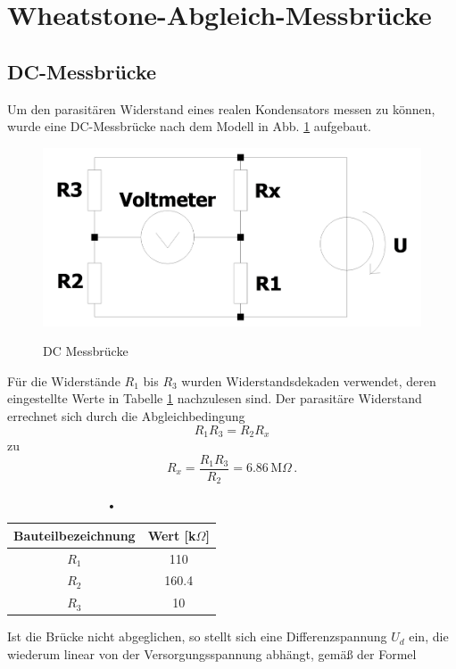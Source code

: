 \section{Wheatstone-Abgleich-Messbrücke}
\subsection{DC-Messbrücke}
Um den parasitären Widerstand eines realen Kondensators messen zu können, wurde eine DC-Messbrücke nach dem Modell in Abb. \ref{fig:dc_messbruecke} aufgebaut. 
\begin{figure}[H]
	\includegraphics[width=\textwidth]{./img/ch3/DC_Wheatstone_Messbruecke.png}
	\label{fig:dc_messbruecke}
	\caption{DC Messbrücke}
\end{figure}
Für die Widerstände $R_1$ bis $R_3$ wurden Widerstandsdekaden verwendet, deren eingestellte Werte in Tabelle \ref{tb:dc_bt} nachzulesen sind. Der parasitäre Widerstand errechnet sich durch die Abgleichbedingung 
\begin{equation}
	R_1 R_3 = R_2 R_x
\end{equation}
zu 
\begin{equation}
	R_x=\frac{R_1 R_3}{R_2} = 6.86\,\text{M}\Omega\,.
\end{equation}
\begin{table}[h]
	\begin{tabular}{|c|c|}
	\hline 
	Bauteilbezeichnung & Wert [k$\Omega$] \\ 
	\hline 
	$R_1$ & 110 \\ 
	\hline 
	$R_2$ & 160.4 \\ 
	\hline 
	$R_3$ & 10 \\ 
	\hline 
	\end{tabular}
	\centering
	\label{tb:dc_bt}
	\caption{•}
\end{table}
Ist die Brücke nicht abgeglichen, so stellt sich eine Differenzspannung $U_d$ ein, die wiederum linear von der Versorgungsspannung abhängt, gemäß der Formel 
